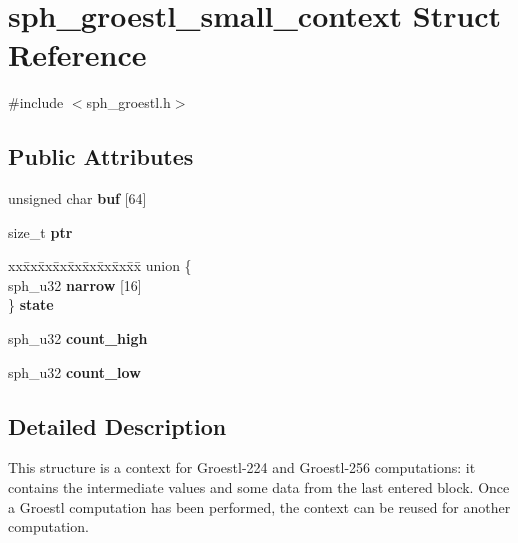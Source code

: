 \hypertarget{structsph__groestl__small__context}{}\section{sph\+\_\+groestl\+\_\+small\+\_\+context Struct Reference}
\label{structsph__groestl__small__context}


{\ttfamily \#include $<$sph\+\_\+groestl.\+h$>$}

\subsection*{Public Attributes}
\begin{DoxyCompactItemize}
\item 
\mbox{\label{structsph__groestl__small__context_a7b791b4f662112ae7a6d0b1cce622570}} 
unsigned char {\bfseries buf} \mbox{[}64\mbox{]}
\item 
\mbox{\label{structsph__groestl__small__context_a941838de2677ce8ff1be7423d6a6fa92}} 
size\+\_\+t {\bfseries ptr}
\item 
\mbox{\label{structsph__groestl__small__context_a28e4073b8d2531283ed242e4d0332363}} 
\begin{tabbing}
xx\=xx\=xx\=xx\=xx\=xx\=xx\=xx\=xx\=\kill
union \{\\
\>sph\_u32 {\bfseries narrow} \mbox{[}16\mbox{]}\\
\} {\bfseries state}\\

\end{tabbing}\item 
\mbox{\label{structsph__groestl__small__context_a237030eb3c8435ff23deae1f2db6d1d5}} 
sph\+\_\+u32 {\bfseries count\+\_\+high}
\item 
\mbox{\label{structsph__groestl__small__context_ab5526e6eb4d083f7f20536a8d83c6520}} 
sph\+\_\+u32 {\bfseries count\+\_\+low}
\end{DoxyCompactItemize}


\subsection{Detailed Description}
This structure is a context for Groestl-\/224 and Groestl-\/256 computations\+: it contains the intermediate values and some data from the last entered block. Once a Groestl computation has been performed, the context can be reused for another computation.

